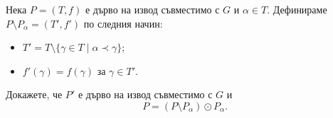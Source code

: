 \begin{problem}
  Нека $P = (T,f)$ е дърво на извод съвместимо с $G$ и $\alpha \in T$.
  Дефинираме $P \setminus P_\alpha = (T',f')$ по следния начин:
  \begin{itemize}
  \item
    $T' = T \setminus \{ \gamma \in T\mid \alpha \prec \gamma\}$;
  \item
    $f'(\gamma) = f(\gamma)$ за $\gamma \in T'$.
  \end{itemize}
  Докажете, че $P'$ е дърво на извод съвместимо с $G$ и 
  \[P = (P\setminus P_\alpha) \odot P_\alpha.\]
\end{problem}

